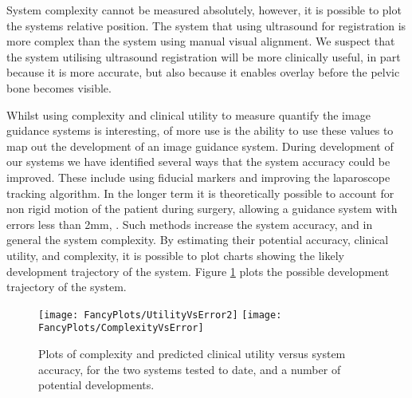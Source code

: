 \documentclass[3p,twocolumn,preprint,10pt]{elsarticle}
\begin{document}
System complexity cannot be measured absolutely, however, it is possible to plot the systems
relative position. The system that using ultrasound for registration is more complex than
the system using manual visual alignment. 
We suspect that the 
system utilising ultrasound registration will be more clinically useful, in part because it is more 
accurate, but also because it enables overlay before the pelvic bone becomes visible.

Whilst using complexity and clinical utility to measure quantify the image guidance systems
is interesting, of more use is the ability to use these values to map out the development 
of an image guidance system. During development of our systems we have identified several 
ways that the system accuracy could be improved. These include using fiducial markers and 
improving the laparoscope tracking algorithm. In the longer term it is theoretically possible to 
account for non rigid motion of the patient during surgery, allowing a guidance system with
errors less than 2mm, \cite{pap279}. Such methods increase the system accuracy, and in general 
the system complexity. By estimating their potential accuracy, clinical utility, and complexity, it 
is possible to plot charts showing the likely development trajectory of the system. Figure \ref{fig:FancyPlots}
plots the possible development trajectory of the system. 
\begin{figure}
\begin{center}
\texttt{[image: FancyPlots/UtilityVsError2]}
\texttt{[image: FancyPlots/ComplexityVsError]}
\end{center}
\caption{\label{fig:FancyPlots}Plots of complexity and predicted clinical utility versus 
system accuracy, for the two systems tested to date, and a number of potential developments.}
\end{figure}
\end{document}
